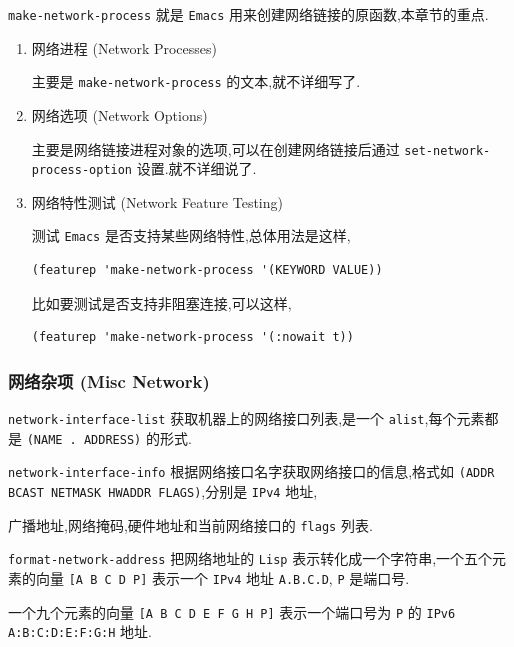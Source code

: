 \documentclass[11pt]{article}
\begin{document}
\texttt{make-network-process} 就是 \texttt{Emacs} 用来创建网络链接的原函数,本章节的重点.


\begin{enumerate}
\item 网络进程 (Network Processes)
\label{sec:orge5c42d2}

主要是 \texttt{make-network-process} 的文本,就不详细写了.

\item 网络选项 (Network Options)
\label{sec:orgdb1f6df}

主要是网络链接进程对象的选项,可以在创建网络链接后通过 \texttt{set-network-process-option} 设置.就不详细说了.

\item 网络特性测试 (Network Feature Testing)
\label{sec:orge320eab}

测试 \texttt{Emacs} 是否支持某些网络特性,总体用法是这样,

\begin{verbatim}
(featurep 'make-network-process '(KEYWORD VALUE))
\end{verbatim}

比如要测试是否支持非阻塞连接,可以这样,

\begin{verbatim}
(featurep 'make-network-process '(:nowait t))
\end{verbatim}
\end{enumerate}


\subsubsection{网络杂项 (Misc Network)}
\label{sec:org07f5c2d}

\texttt{network-interface-list} 获取机器上的网络接口列表,是一个 \texttt{alist},每个元素都是 \texttt{(NAME . ADDRESS)} 的形式.

\texttt{network-interface-info} 根据网络接口名字获取网络接口的信息,格式如 \texttt{(ADDR BCAST NETMASK HWADDR FLAGS)},分别是 \texttt{IPv4} 地址,

广播地址,网络掩码,硬件地址和当前网络接口的 \texttt{flags} 列表.

\texttt{format-network-address} 把网络地址的 \texttt{Lisp} 表示转化成一个字符串,一个五个元素的向量 \texttt{[A B C D P]} 表示一个 \texttt{IPv4} 地址 \texttt{A.B.C.D}, \texttt{P} 是端口号.

一个九个元素的向量 \texttt{[A B C D E F G H P]} 表示一个端口号为 \texttt{P} 的 \texttt{IPv6} \texttt{A:B:C:D:E:F:G:H} 地址.
\end{document}
